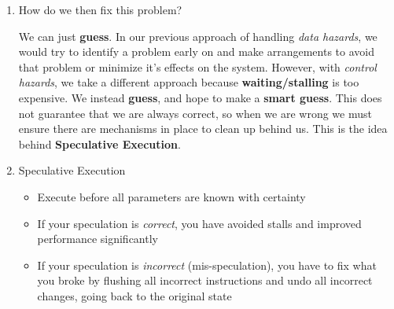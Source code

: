 \documentclass[12pt]{article}
\newenvironment{QandA}{\begin{enumerate}[label=\bfseries\arabic*.]\bfseries}
                      {\end{enumerate}}
\newenvironment{answered}{\par\quad\normalfont}{}
\begin{document}
\begin{QandA}
\begin{answered}
\begin{itemize}
    \item Lastly, building upon the first challenge - when the processor is handling a Branch instruction, it is usually Fetched and then moves onto the \textit{Decode Stage}. But what should we be doing in the \textit{Fetch Stage} next? Logically, we will have to fetch the next instruction in the sequence. But if the previous instruction was indeed a \textbf{Branch} instruction, we should be going to the \textit{target} in the next cycle instead of the next sequential instruction. This is another fundamental problem in handling \textbf{Branch} instructions. \textit{We don't yet know what the right thing to do is, but we have to do something!}. We can \textit{not do anything} but that would then indicate a 3 cycle stall/gap, which isn't good for performance.
\end{itemize}
\end{answered}

\item How do we then fix this problem?
\begin{answered}
    We can just \textbf{guess}. In our previous approach of handling \textit{data hazards}, we would try to identify a problem early on and make arrangements to avoid that problem or minimize it's effects on the system. However, with \textit{control hazards}, we take a different approach because \textbf{waiting/stalling} is too expensive. We instead \textbf{guess}, and hope to make a \textbf{smart guess}. This does not guarantee that we are always correct, so when we are wrong we must ensure there are mechanisms in place to clean up behind us. This is the idea behind \textbf{Speculative Execution}.
\end{answered}

\item Speculative Execution
\vspace{-0.85cm}
\begin{answered}
\begin{itemize}
    \item Execute before all parameters are known with certainty
    \item If your speculation is \textit{correct}, you have avoided stalls and improved performance significantly
    \item If your speculation is \textit{incorrect} (mis-speculation), you have to fix what you broke by flushing all incorrect instructions and undo all incorrect changes, going back to the original state
\end{itemize}
\end{answered}


\end{QandA}
\end{document}
